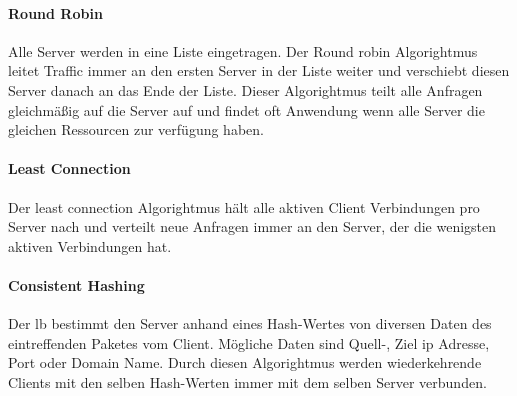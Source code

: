 \paragraph{Round Robin}
Alle Server werden in eine Liste eingetragen. Der Round robin Algorightmus leitet Traffic immer an den ersten Server in der Liste weiter und verschiebt diesen Server danach an das Ende der Liste.
Dieser Algorightmus teilt alle Anfragen gleichmä{\ss}ig auf die Server auf und findet oft Anwendung wenn alle Server die gleichen Ressourcen zur verfügung haben.
\cite{WhatLoadBalancer}

\paragraph{Least Connection}
Der least connection Algorightmus hält alle aktiven Client Verbindungen pro Server nach und verteilt neue Anfragen immer an den Server, der die wenigsten aktiven Verbindungen hat.
\cite{WhatLoadBalancer}

\paragraph{Consistent Hashing}
Der \ac{lb} bestimmt den Server anhand eines Hash-Wertes von diversen Daten des eintreffenden Paketes vom Client.
Mögliche Daten sind Quell-, Ziel \ac{ip} Adresse, Port oder Domain Name. Durch diesen Algorightmus werden wiederkehrende Clients mit den selben Hash-Werten immer mit dem selben Server verbunden.
\cite{WhatLoadBalancer}

